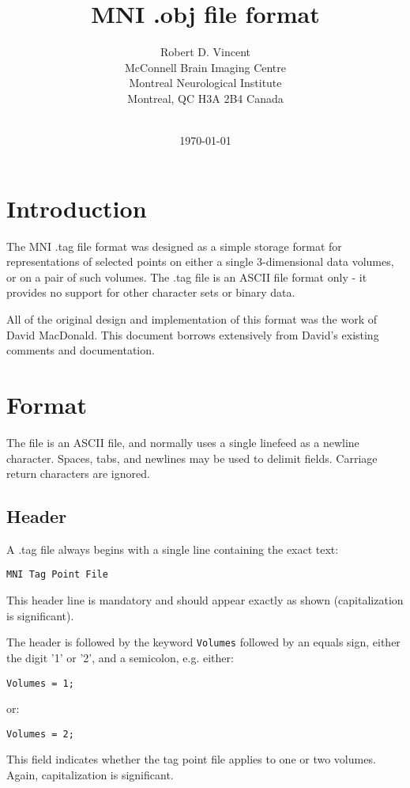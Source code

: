 \documentclass{article}
\title{MNI .obj file format}
\author{Robert D. Vincent \\
McConnell Brain Imaging Centre \\
Montreal Neurological Institute \\
Montreal, QC H3A 2B4 Canada \\~\\
}
\date{\today}
\begin{document}
\maketitle

\section{Introduction}

The MNI .tag file format was designed as a simple storage format for
representations of selected points on either a single 3-dimensional
data volumes, or on a pair of such volumes. The .tag file is an ASCII
file format only - it provides no support for other character sets or
binary data.

All of the original design and implementation of this format was the
work of David MacDonald.  This document borrows extensively from David's
existing comments and documentation.

\section{Format}

The file is an ASCII file, and normally uses a single linefeed as a
newline character. Spaces, tabs, and newlines may be used to delimit
fields. Carriage return characters are ignored.

\subsection{Header}
A .tag file always begins with a single line containing the exact text:

\begin{verbatim}
MNI Tag Point File
\end{verbatim}

This header line is mandatory and should appear exactly as shown
(capitalization is significant).

The header is followed by the keyword {\tt Volumes} followed by an
equals sign, either the digit '1' or '2', and a semicolon, e.g. either:
\begin{verbatim}
Volumes = 1;
\end{verbatim}
or:
\begin{verbatim}
Volumes = 2;
\end{verbatim}

This field indicates whether the tag point file applies to one or two
volumes. Again, capitalization is significant.
\end{document}

